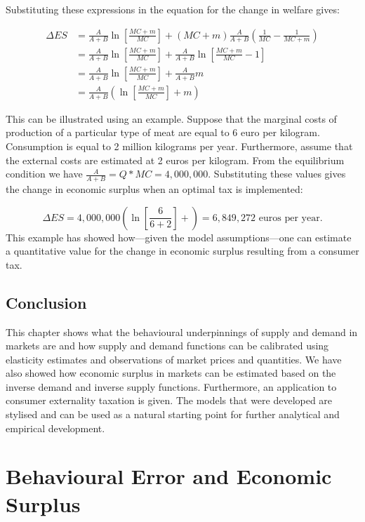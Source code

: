 \documentclass[
]{book}
\begin{document}
Substituting these expressions in the equation for the change in welfare gives:

\begin{align}
 \Delta ES &= \frac{A}{A+B} \ln \left[\frac{MC + m}{MC} \right] + (MC + m) \frac{A}{A+B} \left(\frac{1}{MC} - \frac{1}{MC + m} \right) \\
 &= \frac{A}{A+B} \ln \left[ \frac{MC + m}{MC} \right] +  \frac{A}{A+B} \ln \left[\frac{MC + m}{MC} -1 \right] \\
 &= \frac{A}{A+B} \ln \left[ \frac{MC + m}{MC} \right] +  \frac{A}{A+B} m \\
 &= \frac{A}{A+B}\left( \ln \left[ \frac{MC + m}{MC} \right] +m \right)
\end{align}

This can be illustrated using an example. Suppose that the marginal costs of production of a particular type of meat are equal to 6 euro per kilogram. Consumption is equal to 2 million kilograms per year. Furthermore, assume that the external costs are estimated at 2 euros per kilogram. From the equilibrium condition we have \(\frac{A}{A+B}=Q* MC=4,000,000\). Substituting these values gives the change in economic surplus when an optimal tax is implemented:

\begin{equation}
\Delta ES=4,000,000\left(\ln \left[\frac{6}{6+2} \right]+\right)=6,849,272 \text{ euros per year}.
\end{equation}
This example has showed how---given the model assumptions---one can estimate a quantitative value for the change in economic surplus resulting from a consumer tax.

\hypertarget{conclusion}{%
\section{Conclusion}\label{conclusion}}

This chapter shows what the behavioural underpinnings of supply and demand in markets are and how supply and demand functions can be calibrated using elasticity estimates and observations of market prices and quantities. We have also showed how economic surplus in markets can be estimated based on the inverse demand and inverse supply functions. Furthermore, an application to consumer externality taxation is given. The models that were developed are stylised and can be used as a natural starting point for further analytical and empirical development.

\hypertarget{erroreconsurplus}{%
\chapter{Behavioural Error and Economic Surplus}\label{erroreconsurplus}}
\end{document}
